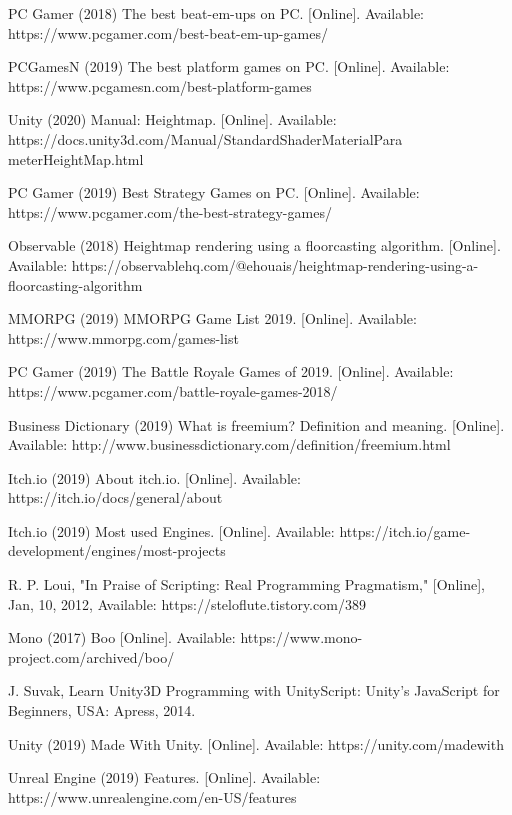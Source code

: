 \begin{thebibliography}{1}
PC Gamer (2018) The best beat-em-ups on PC. [Online]. Available: https://www.pcgamer.com/best-beat-em-up-games/

PCGamesN (2019) The best platform games on PC. [Online]. Available: https://www.pcgamesn.com/best-platform-games

Unity (2020) Manual: Heightmap. [Online]. Available: https://docs.unity3d.com/Manual/StandardShaderMaterialPara
meterHeightMap.html

PC Gamer (2019) Best Strategy Games on PC. [Online]. Available: https://www.pcgamer.com/the-best-strategy-games/

Observable (2018) Heightmap rendering using a floorcasting algorithm. [Online]. Available: https://observablehq.com/@ehouais/heightmap-rendering-using-a-floorcasting-algorithm

MMORPG (2019) MMORPG Game List 2019. [Online]. Available: https://www.mmorpg.com/games-list

PC Gamer (2019) The Battle Royale Games of 2019. [Online]. Available: https://www.pcgamer.com/battle-royale-games-2018/

Business Dictionary (2019) What is freemium? Definition and meaning. [Online]. Available: http://www.businessdictionary.com/definition/freemium.html

Itch.io (2019) About itch.io. [Online]. Available: https://itch.io/docs/general/about

Itch.io (2019) Most used Engines. [Online]. Available: https://itch.io/game-development/engines/most-projects

R. P. Loui, "In Praise of Scripting: Real Programming Pragmatism," [Online], Jan, 10, 2012, Available: https://steloflute.tistory.com/389

Mono (2017) Boo [Online]. Available: https://www.mono-project.com/archived/boo/

J. Suvak, Learn Unity3D Programming with UnityScript: Unity’s JavaScript for Beginners, USA: Apress, 2014.

Unity (2019) Made With Unity. [Online]. Available: https://unity.com/madewith

Unreal Engine (2019) Features. [Online]. Available: https://www.unrealengine.com/en-US/features


\end{thebibliography}
